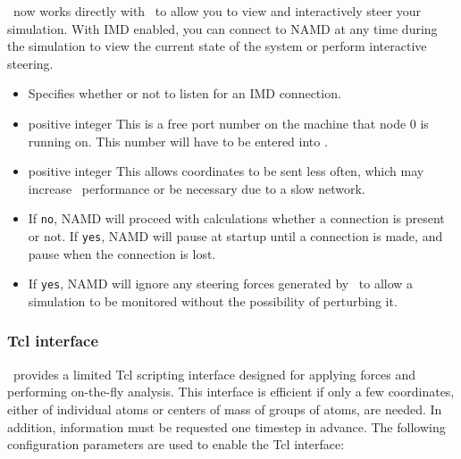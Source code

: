 \NAMD\ now works directly with \VMD\ to allow you to view and interactively
steer your simulation.  With IMD enabled, you can connect to NAMD at any
time during the simulation to view the current state of the system or perform
interactive steering. 

\begin{itemize}
\item
{}
{Specifies whether or not to listen for an IMD connection.}

\item
{}
{positive integer}
{This is a free port number on the machine that node 0 is running on.
This number will have to be entered into \VMD.}

\item
{}
{positive integer}
{This allows coordinates to be sent less often, which may increase
\NAMD\ performance or be necessary due to a slow network.}

\item 
{}
{If {\tt no}, NAMD will proceed with calculations whether a connection is
present or not.  If {\tt yes}, NAMD will pause at startup until a connection is
made, and pause when the connection is lost.}

\item 
{}
{If {\tt yes}, NAMD will ignore any steering forces generated by \VMD\ to allow
a simulation to be monitored without the possibility of perturbing it.}

\end{itemize}


\subsubsection{Tcl interface}

\NAMD\ provides a limited Tcl scripting interface designed for applying forces and performing on-the-fly analysis.
This interface is efficient if only a few coordinates, either of individual atoms or centers of mass of groups of atoms, are needed.
In addition, information must be requested one timestep in advance.
The following configuration parameters are used to enable the Tcl interface:

